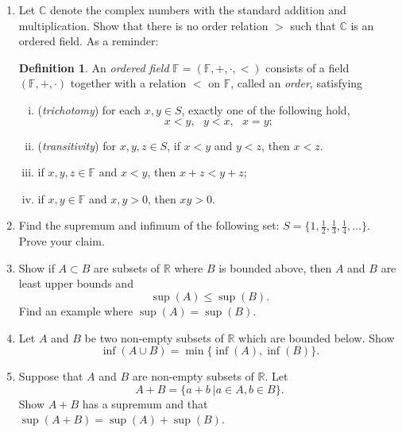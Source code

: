 \documentclass[12pt,letterpaper]{article}
\theoremstyle{plain}
\theoremstyle{definition}
\newtheorem{definition}[theorem]{Definition}
\begin{document}
\begin{enumerate}[1.]
 \item Let $\mathbb{C}$ denote the complex numbers with the standard addition and multiplication. Show that there is no order relation $>$ such that $\mathbb{C}$ is an ordered field. As a reminder:
 \begin{definition}\rm
   An {\it ordered field} $\mathbb{F}=(\mathbb{F},+,\cdot,<)$ consists
   of a field $(\mathbb{F},+,\cdot)$ together with a relation $<$ on $\mathbb{F}$, called
  an \emph{order}, satisfying
  \begin{enumerate}[(i)]
  \item (\emph{trichotomy}) for each $x,y\in S$, exactly one of the following hold,
 $$
   x<y, \ \ \ y<x, \ \ \ x=y;
 $$
  \item (\emph{transitivity}) for $x,y,z\in S$, 
   if $x<y$ and $y<z$, then $x<z$.
   \item if $x,y,z\in \mathbb{F}$ and $x<y$, then $x+z<y+z$;
   \item if $x,y\in \mathbb{F}$ and $x,y>0$, then $xy>0$.
  \end{enumerate} 
\end{definition} 
 \item Find the supremum and infimum of the following set: $S=\{1,\frac{1}{2}, \frac{1}{3},\frac{1}{4},\ldots\}$. Prove your claim. 
\item Show if $A\subset B$ are subsets of $\mathbb{R}$ where $B$ is bounded above, then $A$ and $B$ are least upper bounds and 
\[\sup(A)\leq \sup(B).\]
Find an example where $\sup(A)=\sup(B)$.  
 \item Let $A$ and $B$ be two non-empty subsets of $\mathbb{R}$ which are bounded below. 
 Show \[\inf(A\cup B)=\min\{\inf(A),\inf(B)\}.\]
\item Suppose that $A$ and $B$ are non-empty subsets of $\mathbb{R}$. Let 
\[A+B=\{a+b\ | a\in A, b\in B\}.\]
Show $A+B$ has a supremum and that $\sup(A+B)=\sup(A)+\sup(B)$. 


 \end{enumerate}
\end{document}
